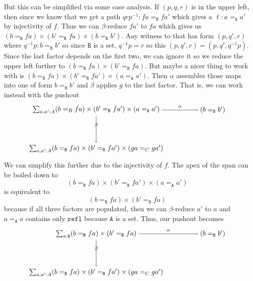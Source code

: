 \message{ !name(notes.tex)}\documentclass[12pt]{amsart}
\newcommand{\type}[1]{\mathtt{#1}}
\newcommand{\A}{\type{A}}
\newcommand{\B}{\type{B}}
\newcommand{\refl}{\type{refl}}
\theoremstyle{remark}
\theoremstyle{definition}
\begin{document}
But this can be simplified via some case analysis. If $ (p,q,r) $ is
in the upper left, then since we know that we get a path
$ q r p^{-1} : fa =_{\B} fa' $ which gives a $ \ell : a =_{\A} a' $ by
injectivity of $ f $.  Thus we can $ \beta $-reduce $ fa' $ to $ fa $
which gives us
$ (b=_{\B} fa) \times (b'=_{\B} fa) \times (b=_{\B} b') $.  Any
witness to that has form $ (p,q',r) $ where $ q^{-1}p : b =_{\B} b' $
so since $ \B $ is a set, $ q^{-1}p = r $ so this
$ (p,q',r) = (p,q',q^{-1}p) $.  Since the last factor depends on the
first two, we can ignore it so we reduce the upper left further to
$ (b=_{\B} fa) \times (b'=_{\B} fa) $.  But maybe a nicer thing to
work with is
$ (b=_{\B} fa) \times (b'=_{\B} fa') \times (a =_{\A} a') $.  Then
$ \alpha $ assembles those maps into one of form $ b =_{\B} b' $ and
$ \beta $ applies $ g $ to the last factor. That is, we can work
instead with the pushout
\[
\begin{tikzpicture}
	\node (1) at (0,2) 
	{ $ \sum_{ a , a' : A } 
		( b =_B f  a ) 
		\times ( b' =_{\B} f  a' ) 
		\times ( a =_{\A} a' ) $ };
	\node (2) at (6,2) 
	{ $ ( b =_{\B} b' ) $ };
	\node (3) at (0,0) 
	{ $ \sum_{ a , a' : A } 
		( b =_{\B} f a ) 
		\times  (b' =_{\B} f a' ) 
		\times ( g a =_C g a' ) $ };
	\draw [ -> ] (1) to 
	node [above] {\scriptsize $ \alpha $} 
	(2);
	\draw [ -> ] (1) to 
	node [above] {\scriptsize $ \beta $}
	(3);
\end{tikzpicture}
\]
We can simplify this further due to the injectivity of $ f $.  The apex of the span can be boiled down to  
\[
	( b =_{\B} fa ) \times ( b' =_{\B} fa' ) \times ( a =_{\A} a' )  
\] 
is equivalent to 
\[
	( b =_{\B} fa ) \times ( b' =_{\B} fa ) 
\]
because if all three factors are populated, then we can $ \beta $-reduce $ a' $ to $ a $ and $ a =_{\A} a $ contains only $ \refl $ because $ \A $ is a set.  Thus, our pushout becomes
\[
\begin{tikzpicture}
	\node (1) at (0,2) 
		{ $ \sum_{ a : \A } 
		( b =_\B f  a ) 
		\times ( b' =_{\B} f  a ) $} ; 
	\node (2) at (6,2) 
		{ $ ( b =_{\B} b' ) $ };
	\node (3) at (0,0) 
		{ $ \sum_{ a , a' : A } 
		( b =_{\B} f a ) 
		\times  (b' =_{\B} f a' ) 
		\times ( g a =_C g a' ) $ };
	\draw [ -> ] (1) to 
		node [above] {\scriptsize $ \alpha $} 
		(2);
	\draw [ -> ] (1) to 
		node [above] {\scriptsize $ \beta $}
		(3);
\end{tikzpicture}
\]
\end{document}
